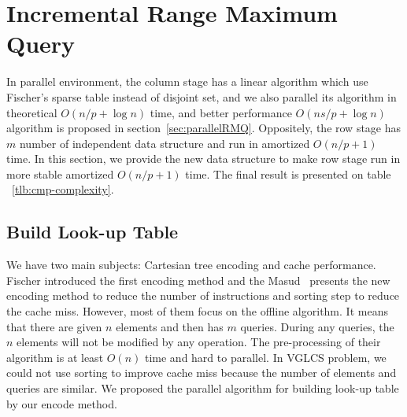 \section{Incremental Range Maximum Query}
\label{sec:parallelIRMQ}

In parallel environment, the column stage has a linear algorithm which
use Fischer's sparse table instead of disjoint set, and we also parallel
its algorithm in theoretical $O(n / p + \log n)$ time, and better
performance $O(n s / p + \log n)$ algorithm is proposed in
section~\ref{sec:parallelRMQ}.  Oppositely, the row stage has $m$ number
of independent data structure and run in amortized $O(n / p + 1)$ time.
In this section, we provide the new data structure to make row stage run
in more stable amortized $O(n / p + 1)$ time.   The final result is
presented on table ~\ref{tlb:cmp-complexity}.

\iffalse
VGLCS 問題主要分成縱向和橫向兩階段，縱向處理每一列的區間極值查找，橫向處理每一行的區間極值查找，
兩者合併構成區域極值查找。在縱向方面為數個獨立的數據結構，這部分易於平行；
相反地，在橫向方面，需要共同協作一個數據結構。
綜觀這兩者的差異，縱向需要動態的後綴插入和區間查詢，而橫向可以離線完成區間查找。
在上一節中，我們提出在橫向處理的實作，若限制上述的實作方案在單一處理器上，
時間複雜度的瓶頸在於縱向的動態更新與查找。

在這個章節中，我們提出支持動態插入和區間查找的數據結構，最後的成果如表 \ref{tlb:cmp-complexity}。
\fi




\subsection{Build Look-up Table}

We have two main subjects: Cartesian tree encoding and cache
performance.  Fischer introduced the first encoding method and the
Masud~\cite{Hasan2010CacheOA} presents the new encoding method to reduce
the number of instructions and sorting step to reduce the cache miss.
However, most of them focus on the offline algorithm.  It means that
there are given $n$ elements and then has $m$ queries. During any
queries, the $n$ elements will not be modified by any operation.  The
pre-processing of their algorithm is at least $O(n)$ time and hard to
parallel.  In VGLCS problem, we could not use sorting to improve cache
miss because the number of elements and queries are similar.  We
proposed the parallel algorithm for building look-up table by our encode
method.


